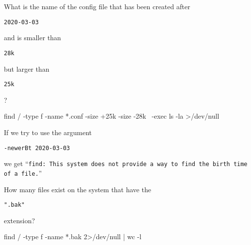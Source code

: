 \documentclass[a4paper,12pt]{article}
\newcommand{\bashinline}[1]{%
\colorbox{bashcodebg}{%
\parbox[b][0.6em]{\widthof{\texttt{#1}}}{\texttt{#1}}%
}%
}
\begin{document}
What is the name of the config file that has been created after \bashinline{2020-03-03} and is smaller than \bashinline{28k} but larger than \bashinline{25k}?
\begin{bash}
find / -type f -name *.conf -size +25k -size -28k \
-exec ls -la {} >/dev/null
\end{bash}

If we try to use the argument \bashinline{-newerBt 2020-03-03} we get
``\texttt{find: This system does not provide a way to find the birth time of a file.}''

\n

How many files exist on the system that have the \bashinline{".bak"} extension?
\begin{bash}
find / -type f -name *.bak 2>/dev/null | wc -l
\end{bash}
\end{document}
